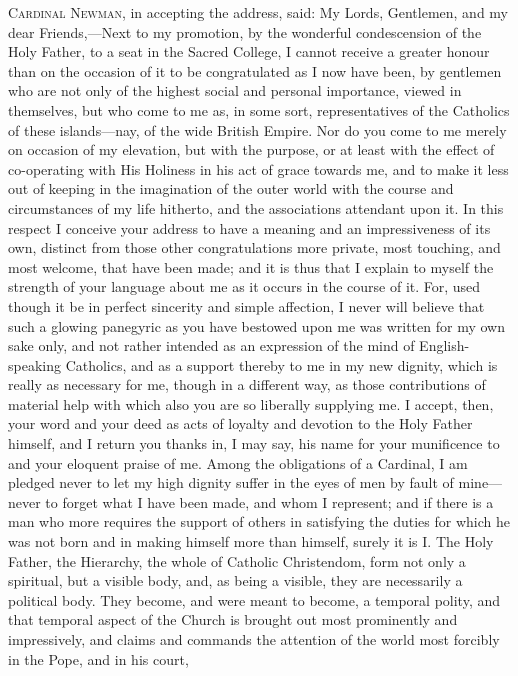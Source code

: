C\textsc{ardinal} N\textsc{ewman},
in accepting the address, said: My Lords, Gentlemen, and my dear
Friends,—Next to my promotion, by the wonderful condescension of the
Holy Father, to a seat in the Sacred College, I cannot receive a
greater honour than on the occasion of it to be congratulated as I now
have been, by gentlemen who are not only of the highest social and
personal importance, viewed in themselves, but who come to me as, in
some sort, representatives of the Catholics of these islands—nay, of
the wide British Empire. Nor do you come to me merely on occasion of
my elevation, but with the purpose, or at least with the effect of
co-operating with His Holiness in his act of grace towards me, and to
make it less out of keeping in the imagination of the outer world with
the course and circumstances of my life hitherto, and the associations
attendant upon it. In this respect I conceive your address to have a
meaning and an impressiveness of its own, distinct from those other
congratulations more private, most touching, and most welcome, that
have been made; and it is thus that I explain to myself the strength
of your language about me as it occurs in the course of it. For, used
though it be in perfect sincerity and simple affection, I never will
believe that such a glowing panegyric as you have bestowed upon me was
written for my own sake only, and not rather intended as an expression
of the mind of English-speaking Catholics, and as a support thereby to
me in my new dignity, which is really as necessary for me, though in a
different way, as those contributions of material help with which also
you are so liberally supplying me. I accept, then, your word and your
deed as acts of loyalty and devotion to the Holy Father himself, and I
return you thanks in, I may say, his name for your munificence to and
your eloquent praise of me. Among the obligations of a Cardinal, I am
pledged never to let my high dignity suffer in the eyes of men by
fault of mine—never to forget what I have been made, and whom I
represent; and if there is a man who more requires the support of
others in satisfying the duties for which he was not born and in
making himself more than himself, surely it is I. The Holy Father, the
Hierarchy, the whole of Catholic Christendom, form not only a
spiritual, but a visible body, and, as being a visible, they are
necessarily a political body. They become, and were meant to become, a
temporal polity, and that temporal aspect of the Church is brought out
most prominently and impressively, and claims and commands the
attention of the world most forcibly in the Pope, and in his court,
